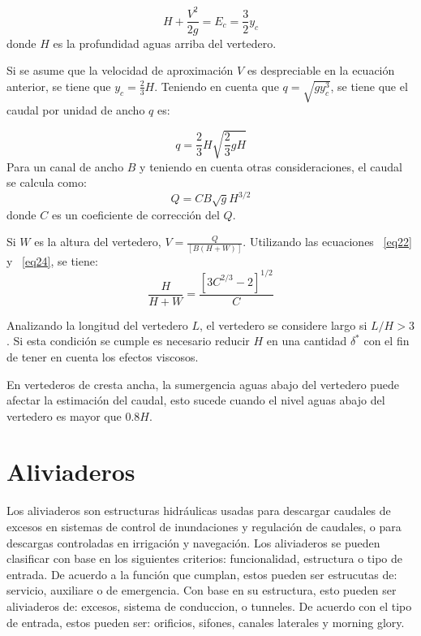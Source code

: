 \documentclass[11pt, oneside]{article}
\begin{document}
\begin{equation}
    H + \frac{V^2}{2g} = E_c = \frac{3}{2}y_c
    \label{eq22}
\end{equation}
donde $H$ es la profundidad aguas arriba del vertedero.

Si se asume que la velocidad de aproximaci\'on $V$ es despreciable en la ecuaci\'on anterior, se tiene que $y_c = \frac{2}{3}H$. Teniendo en cuenta que $q = \sqrt{g y_c^3}$, se tiene que el caudal por unidad de ancho $q$ es:

\begin{equation}
    q = \frac{2}{3}H \sqrt{\frac{2}{3} g H}
    \label{eq23}
\end{equation}
Para un canal de ancho $B$ y teniendo en cuenta otras consideraciones, el caudal se calcula como:
\begin{equation}
    Q = C B \sqrt{g} H^{3/2}
    \label{eq24}
\end{equation}
donde $C$ es un coeficiente de correcci\'on del $Q$. 

Si $W$ es la altura del vertedero, $V = \frac{Q}{\left[B\left(H+W\right)\right]}$. Utilizando las ecuaciones ~\ref{eq22} y ~\ref{eq24}, se tiene:
\begin{equation}
    \frac{H}{H+W} = \frac{\left[3 C^{2/3}-2 \right]^{1/2}}{C}
    \label{eq25}
\end{equation}

Analizando la longitud del vertedero $L$, el vertedero se considere largo si $L/H >3$. Si esta condici\'on se cumple es necesario reducir $H$ en una cantidad $\delta^*$ con el fin de tener en cuenta los efectos viscosos.

En vertederos de cresta ancha, la sumergencia aguas abajo del vertedero puede afectar la estimaci\'on del caudal, esto sucede cuando el nivel aguas abajo del vertedero es mayor que $0.8H$. 

\section{Aliviaderos}
Los aliviaderos son estructuras hidr\'aulicas usadas para descargar caudales de excesos en sistemas de control de inundaciones y regulaci\'on de caudales, o para descargas controladas en irrigaci\'on y navegaci\'on. Los aliviaderos se pueden clasificar con base en los siguientes criterios: funcionalidad, estructura o tipo de entrada. De acuerdo a la funci\'on que cumplan, estos pueden ser estrucutas de: servicio, auxiliare o de emergencia. Con base en su estructura, esto pueden ser aliviaderos de: excesos, sistema de conduccion, o tunneles. De acuerdo con el tipo de entrada, estos pueden ser: orificios, sifones, canales laterales y morning glory. 
\end{document}
